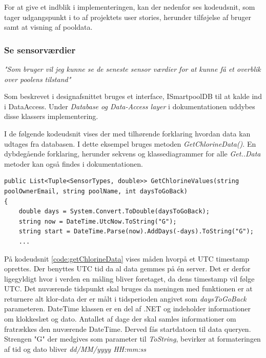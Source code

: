 For at give et indblik i implementeringen, kan der nedenfor ses kodeudsnit, som tager udgangspunkt i to af projektets user stories, herunder tilføjelse af bruger samt at visning af pooldata.

\subsubsection{Se sensorværdier}

\textit{"Som bruger vil jeg kunne se de seneste sensor værdier for at kunne få et overblik over poolens tilstand"}\

Som beskrevet i designafsnittet bruges et interface, ISmartpoolDB til at kalde ind i DataAccess. Under \textit{Database og Data-Access layer} i dokumentationen uddybes disse klassers implementering.

I de følgende kodeudsnit vises der med tilhørende forklaring hvordan data kan udtages fra databasen. I dette eksempel bruges metoden \textit{GetChlorineData()}. En dybdegående forklaring, herunder sekvens og klassediagrammer for alle \textit{Get..Data} metoder kan også findes i dokumentationen.





\begin{lstlisting}[caption=GetChlorineData metoden - konvertering af DateTime objekter, label=code:getChlorineData]
public List<Tuple<SensorTypes, double>> GetChlorineValues(string poolOwnerEmail, string poolName, int daysToGoBack)
{
	double days = System.Convert.ToDouble(daysToGoBack);
	string now = DateTime.UtcNow.ToString("G");
	string start = DateTime.Parse(now).AddDays(-days).ToString("G");
	...
\end{lstlisting}

På kodeudsnit \ref{code:getChlorineData} vises måden hvorpå et UTC timestamp oprettes. Der benyttes UTC tid da al data gemmes på én server. Det er derfor ligegyldigt hvor i verden en måling bliver foretaget, da dens timestamp vil følge UTC. Det nuværende tidspunkt skal bruges da meningen med funktionen er at returnere alt klor-data der er målt i tidsperioden angivet som \textit{daysToGoBack} parameteren. DateTime \cite{dotnetdatetime} klassen er en del af .NET og indeholder informationer om klokkeslæt og dato. Antallet af dage der skal samles informationer om fratrækkes den nuværende DateTime. Derved fås startdatoen til data queryen. Strengen "G" der medgives som parameter til \textit{ToString}, bevirker at formateringen af tid og dato bliver \textit{dd/MM/yyyy HH:mm:ss}

